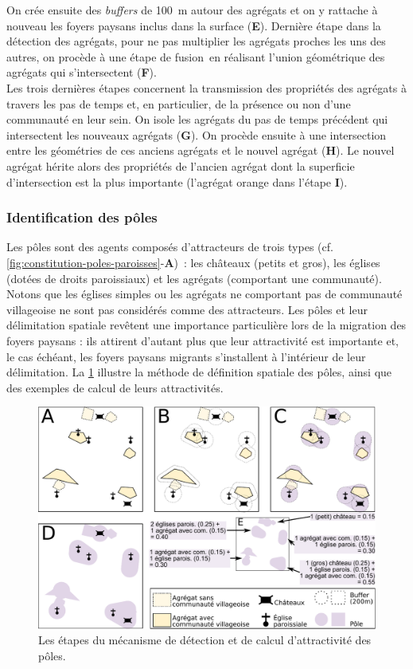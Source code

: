 On crée ensuite des \textit{buffers} de 100~m autour des agrégats et on y rattache à nouveau les foyers paysans inclus dans la surface (\textbf{E}).
Dernière étape dans la détection des agrégats, pour ne pas multiplier les agrégats proches les uns des autres, on procède à une étape de fusion en réalisant l'union géométrique des agrégats qui s'intersectent (\textbf{F}).\\
Les trois dernières étapes concernent la transmission des propriétés des agrégats à travers les pas de temps et, en particulier, de la présence ou non d'une communauté en leur sein.
On isole les agrégats du pas de temps précédent qui intersectent les nouveaux agrégats (\textbf{G}).
On procède ensuite à une intersection entre les géométries de ces anciens agrégats et le nouvel agrégat (\textbf{H}).
Le nouvel agrégat hérite alors des propriétés de l'ancien agrégat dont la superficie d'intersection est la plus importante (l'agrégat orange dans l'étape \textbf{I}).
	
\subsubsection{Identification des pôles \label{sssec:poles}}

Les pôles sont des agents composés d'attracteurs de trois types (cf. \cref{fig:constitution-poles-paroisses}-\textbf{A}) : les châteaux (petits et gros), les églises (dotées de droits paroissiaux) et les agrégats (comportant une communauté).
Notons que les églises simples ou les agrégats ne comportant pas de communauté villageoise ne sont pas considérés comme des attracteurs.
Les pôles et leur délimitation spatiale revêtent une importance particulière lors de la migration des foyers paysans : ils attirent d'autant plus que leur attractivité est importante et, le cas échéant, les foyers paysans migrants s'installent à l'intérieur de leur délimitation.
La \cref{fig:detection-poles} illustre la méthode de définition spatiale des pôles, ainsi que des exemples de calcul de leurs attractivités.

\begin{figure}[H]
	\centering
	\includegraphics[width=\linewidth]{img/detection_poles.pdf}
	\caption{Les étapes du mécanisme de détection et de calcul d'attractivité des pôles.}
	\label{fig:detection-poles}
\end{figure}

